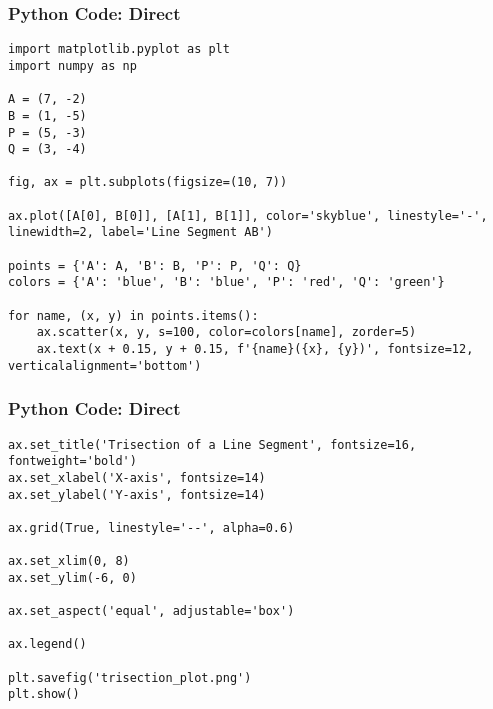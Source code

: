 \documentclass{beamer}
\begin{document}
\begin{frame}[fragile]
\frametitle{Python Code: Direct}
\begin{lstlisting}
import matplotlib.pyplot as plt
import numpy as np

A = (7, -2)
B = (1, -5)
P = (5, -3)
Q = (3, -4)

fig, ax = plt.subplots(figsize=(10, 7))

ax.plot([A[0], B[0]], [A[1], B[1]], color='skyblue', linestyle='-', linewidth=2, label='Line Segment AB')

points = {'A': A, 'B': B, 'P': P, 'Q': Q}
colors = {'A': 'blue', 'B': 'blue', 'P': 'red', 'Q': 'green'}

for name, (x, y) in points.items():
    ax.scatter(x, y, s=100, color=colors[name], zorder=5) 
    ax.text(x + 0.15, y + 0.15, f'{name}({x}, {y})', fontsize=12, verticalalignment='bottom')
\end{lstlisting}
    
\end{frame}


\begin{frame}[fragile]
\frametitle{Python Code: Direct}
\begin{lstlisting}
ax.set_title('Trisection of a Line Segment', fontsize=16, fontweight='bold')
ax.set_xlabel('X-axis', fontsize=14)
ax.set_ylabel('Y-axis', fontsize=14)

ax.grid(True, linestyle='--', alpha=0.6)

ax.set_xlim(0, 8)
ax.set_ylim(-6, 0)

ax.set_aspect('equal', adjustable='box')

ax.legend()

plt.savefig('trisection_plot.png')
plt.show()

\end{lstlisting}
\end{frame}
\end{document}
